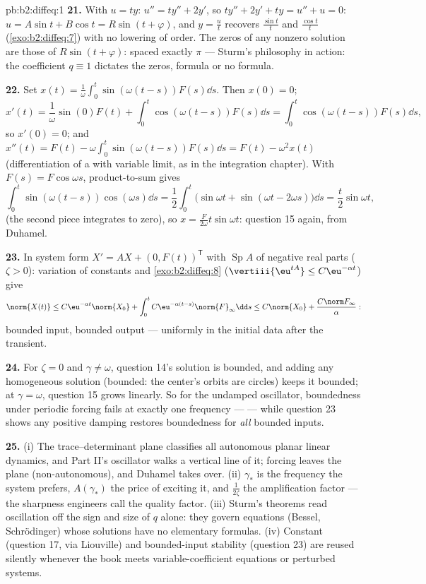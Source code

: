 \begin{solution}{pb:b2:diffeq:1}
\textbf{21.} With $u = ty$: $u'' = ty'' + 2y'$, so $ty'' + 2y'
+ ty = u'' + u = 0$: $u = A\sin t + B\cos t = R\sin(t +
\varphi)$, and $y = \frac{u}{t}$ recovers $\frac{\sin t}t$ and
$\frac{\cos t}t$ (\cref{exo:b2:diffeq:7}) with no lowering of
order. The zeros of any nonzero solution are those of
$R\sin(t + \varphi)$: spaced exactly $\pi$ --- Sturm's
philosophy in action: the coefficient $q \equiv 1$ dictates
the zeros, formula or no formula.

\textbf{22.} Set $x(t) =
\frac1\omega\int_0^t\sin(\omega(t-s))F(s)\dd s$. Then $x(0) =
0$;
\[
x'(t) = \frac1\omega\sin(0)F(t) +
\int_0^t\cos(\omega(t-s))F(s)\dd s
= \int_0^t\cos(\omega(t-s))F(s)\dd s ,
\]
so $x'(0) = 0$; and $x''(t) = F(t) -
\omega\int_0^t\sin(\omega(t-s))F(s)\dd s = F(t) - \omega^2x(t)$
(differentiation of a  with variable limit,
as in the integration chapter). With $F(s) = F\cos\omega s$,
product-to-sum gives
\[
\int_0^t\sin(\omega(t-s))\cos(\omega s)\dd s
= \frac12\int_0^t\bigl(\sin\omega t + \sin(\omega t -
2\omega s)\bigr)\dd s
= \frac{t}{2}\sin\omega t ,
\]
(the second piece integrates to zero), so $x =
\frac{F}{2\omega}t\sin\omega t$: question 15 again, from
Duhamel.

\textbf{23.} In system form $X' = AX + (0, F(t))^{\mathsf T}$
with $\operatorname{Sp}A$ of negative real parts ($\zeta >
0$): variation of constants and \cref{exo:b2:diffeq:8}
($\vertiii{\eu^{tA}} \leq C\eu^{-\alpha t}$) give
\[
\norm{X(t)} \leq C\eu^{-\alpha t}\norm{X_0}
+ \int_0^t C\eu^{-\alpha(t-s)}\norm{F}_\infty\dd s
\leq C\norm{X_0} + \frac{C\norm F_\infty}{\alpha} :
\]
bounded input, bounded output --- uniformly in the initial
data after the transient.

\textbf{24.} For $\zeta = 0$ and $\gamma \neq \omega$,
question 14's solution is bounded, and adding any homogeneous
solution (bounded: the center's orbits are circles) keeps it
bounded; at $\gamma = \omega$, question 15 grows linearly. So
for the undamped oscillator, boundedness under periodic
forcing fails at exactly one frequency ---  ---
while question 23 shows any positive damping restores
boundedness for \emph{all} bounded inputs.

\textbf{25.} (i) The trace--determinant plane classifies all
autonomous planar linear dynamics, and Part II's oscillator
walks a vertical line of it; forcing leaves the plane
(non-autonomous), and Duhamel takes over. (ii) $\gamma_*$ is
the frequency the system prefers, $A(\gamma_*)$ the price of
exciting it, and $\frac{1}{2\zeta}$ the amplification factor
--- the  sharpness engineers call the quality
factor. (iii) Sturm's theorems read oscillation off the sign
and size of $q$ alone: they govern equations (Bessel,
Schr\"odinger) whose solutions have no elementary formulas.
(iv) Constant  (question 17, via Liouville) and
bounded-input stability (question 23) are reused silently
whenever the book meets variable-coefficient equations or
perturbed systems.
\end{solution}
